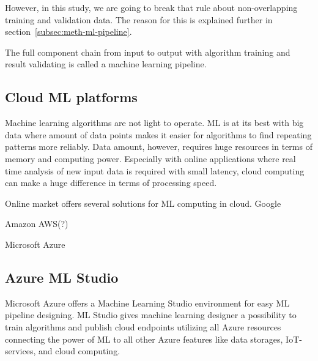 However, in this study,
we are going to break that rule
about non-overlapping training and validation data.
The reason for this is explained further in section~\ref{subsec:meth-ml-pipeline}.




The full component chain from input to output
with algorithm training and result validating
is called a machine learning pipeline.


\subsection{Cloud ML platforms}\label{subsec:bg-cloud-ml-platforms}

Machine learning algorithms are not light to operate.
ML is at its best with big data
where amount of data points
makes it easier for algorithms
to find repeating patterns more reliably.
Data amount, however,
requires huge resources in terms of memory and computing power.
Especially with online applications
where real time analysis of new input data is required
with small latency,
cloud computing can make a huge difference
in terms of processing speed. %

Online market offers several solutions for ML computing in cloud.
Google

Amazon AWS(?)

Microsoft Azure\cite{altexsoft}


\subsection{Azure ML Studio}\label{subsec:bg-azure-ml-studio-algorithms}

Microsoft Azure offers a Machine Learning Studio environment
for easy ML pipeline designing.
ML Studio gives machine learning designer a possibility to
train algorithms and publish cloud endpoints
utilizing all Azure resources
connecting the power of ML
to all other Azure features
like data storages, IoT-services, and cloud computing.

